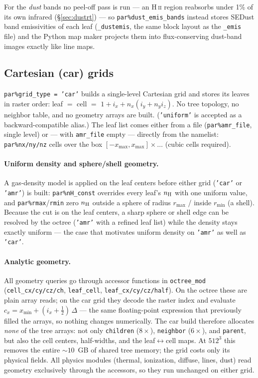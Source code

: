 \documentclass[english,a4paper]{my_memo}
\newcommand{\code}[1]{\texttt{#1}}
\begin{document}
For the \emph{dust} bands no peel-off pass is run --- an H\,\textsc{ii}
region reabsorbs under 1\% of its own infrared (\S\ref{sec:dustrt}) --- so
\code{par\%dust\_emis\_bands} instead stores SEDust band emissivities of each leaf
(\code{\_dustemis}, the same block layout as the \code{\_emis} file)
and the Python map maker projects them into flux-conserving dust-band
images exactly like line maps.

\subsection{Cartesian (car) grids}
\label{sec:uniform}
\code{par\%grid\_type = 'car'} builds a single-level Cartesian grid and
stores its leaves in raster order: leaf $=$ cell $=$
$1 + i_x + n_x(i_y + n_y i_z)$.  No tree topology, no neighbor
table, and no geometry arrays are built.  (\code{'uniform'} is accepted
as a backward-compatible alias.)  The leaf list comes either from a file
(\code{par\%amr\_file}, single level) or --- with \code{amr\_file} empty
--- directly from the namelist: \code{par\%nx/ny/nz} cells over the box
$[-x_{\max},x_{\max}]{\times}\dots$ (cubic cells required).

\paragraph{Uniform density and sphere/shell geometry.}  A gas-density
model is applied on the leaf centers before either grid (\code{'car'} or
\code{'amr'}) is built: \code{par\%nH\_const} overrides every leaf's
$n_{\rm H}$ with one uniform value, and \code{par\%rmax}/\code{rmin} zero
$n_{\rm H}$ outside a sphere of radius $r_{\max}$ / inside $r_{\min}$ (a
shell).  Because the cut is on the leaf centers, a sharp sphere or shell
edge can be resolved by the octree (\code{'amr'} with a refined leaf
list) while the density stays exactly uniform --- the case that motivates
uniform density on \code{'amr'} as well as \code{'car'}.

\paragraph{Analytic geometry.}  All geometry queries go through
accessor functions in \code{octree\_mod} (\code{cell\_cx/cy/cz/ch},
\code{leaf\_cell}, \code{leaf\_cx/cy/cz/half}).  On the octree these
are plain array reads; on the car grid they decode the raster
index and evaluate
$c_x = x_{\min} + (i_x + \tfrac12)\,\Delta$ --- the same
floating-point expression that previously filled the arrays, so
nothing changes numerically.  The car build therefore allocates
\emph{none} of the tree arrays: not only \code{children}
($8{\times}$), \code{neighbor} ($6{\times}$), and \code{parent}, but
also the cell centers, half-widths, and the leaf${\leftrightarrow}$cell
maps.  At $512^3$ this removes the entire ${\sim}10$~GB of shared
tree memory; the grid costs only its physical fields.  All physics
modules (thermal, ionization, diffuse, lines, dust) read geometry
exclusively through the accessors, so they run unchanged on either
grid.
\end{document}
